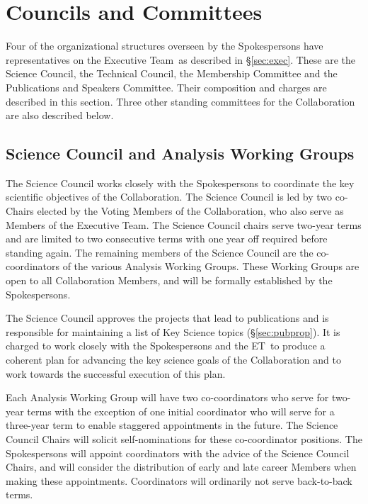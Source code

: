 \documentclass[12pt]{article}
\newcommand{\exec}{{Executive Team}}
\newcommand{\shorte}{{ET}}  %
\begin{document}
\section{Councils and Committees}
\label{sec:councils}
Four of the organizational structures overseen by the Spokespersons have representatives on the \exec\ as described in 
\S\ref{sec:exec}.  These are the Science Council, the Technical Council, the Membership Committee and the Publications and Speakers Committee.  Their composition and charges are described in this section.  Three other standing committees for the Collaboration %
are also described below.  

\subsection{Science Council and Analysis Working Groups}
\label{sec:SC}

The Science Council works closely with the Spokespersons to coordinate the key scientific objectives of the Collaboration.  The Science Council is led by two co-Chairs elected by the Voting Members of the Collaboration, who also serve as Members of the \exec.   \textcolor{\markcolor}{The Science Council chairs serve two-year terms and are limited to two consecutive terms with one year off required before standing again.}
The remaining members of the Science Council are the co-coordinators of the various Analysis Working Groups. These Working Groups are open to all Collaboration Members, and will be formally established by the Spokespersons.  

The Science Council approves the projects that lead to publications and is responsible for maintaining a list of Key Science topics  (\S\ref{sec:pubprop}). \textcolor{\markcolor}{It is charged to work closely with the Spokespersons and the \shorte\ to produce a coherent plan for advancing the key science goals of the Collaboration and to work towards the successful execution of this plan.}

Each Analysis Working Group will have two co-coordinators who  serve for two-year terms with the exception of one initial coordinator who will serve for a three-year term to enable staggered appointments in the future.  The Science Council Chairs will solicit self-nominations for these co-coordinator positions. The Spokespersons will appoint coordinators with the advice of the Science Council Chairs, and will consider the distribution of early and late career Members when making these appointments. Coordinators will ordinarily not serve back-to-back terms.
\end{document}
